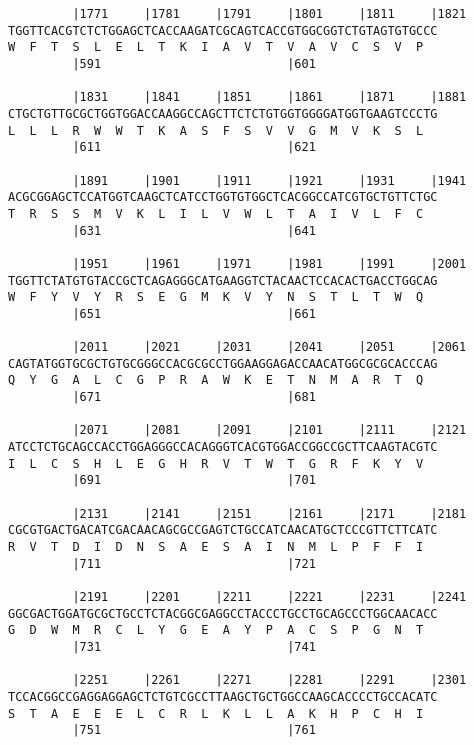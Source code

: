 \documentclass{article}
\begin{document}
\begin{Verbatim}
         |1771     |1781     |1791     |1801     |1811     |1821
TGGTTCACGTCTCTGGAGCTCACCAAGATCGCAGTCACCGTGGCGGTCTGTAGTGTGCCC
W  F  T  S  L  E  L  T  K  I  A  V  T  V  A  V  C  S  V  P  
         |591                          |601                 
  
         |1831     |1841     |1851     |1861     |1871     |1881
CTGCTGTTGCGCTGGTGGACCAAGGCCAGCTTCTCTGTGGTGGGGATGGTGAAGTCCCTG
L  L  L  R  W  W  T  K  A  S  F  S  V  V  G  M  V  K  S  L  
         |611                          |621                 
  
         |1891     |1901     |1911     |1921     |1931     |1941
ACGCGGAGCTCCATGGTCAAGCTCATCCTGGTGTGGCTCACGGCCATCGTGCTGTTCTGC
T  R  S  S  M  V  K  L  I  L  V  W  L  T  A  I  V  L  F  C  
         |631                          |641                 
  
         |1951     |1961     |1971     |1981     |1991     |2001
TGGTTCTATGTGTACCGCTCAGAGGGCATGAAGGTCTACAACTCCACACTGACCTGGCAG
W  F  Y  V  Y  R  S  E  G  M  K  V  Y  N  S  T  L  T  W  Q  
         |651                          |661                 
  
         |2011     |2021     |2031     |2041     |2051     |2061
CAGTATGGTGCGCTGTGCGGGCCACGCGCCTGGAAGGAGACCAACATGGCGCGCACCCAG
Q  Y  G  A  L  C  G  P  R  A  W  K  E  T  N  M  A  R  T  Q  
         |671                          |681                 
  
         |2071     |2081     |2091     |2101     |2111     |2121
ATCCTCTGCAGCCACCTGGAGGGCCACAGGGTCACGTGGACCGGCCGCTTCAAGTACGTC
I  L  C  S  H  L  E  G  H  R  V  T  W  T  G  R  F  K  Y  V  
         |691                          |701                 
  
         |2131     |2141     |2151     |2161     |2171     |2181
CGCGTGACTGACATCGACAACAGCGCCGAGTCTGCCATCAACATGCTCCCGTTCTTCATC
R  V  T  D  I  D  N  S  A  E  S  A  I  N  M  L  P  F  F  I  
         |711                          |721                 
  
         |2191     |2201     |2211     |2221     |2231     |2241
GGCGACTGGATGCGCTGCCTCTACGGCGAGGCCTACCCTGCCTGCAGCCCTGGCAACACC
G  D  W  M  R  C  L  Y  G  E  A  Y  P  A  C  S  P  G  N  T  
         |731                          |741                 
  
         |2251     |2261     |2271     |2281     |2291     |2301
TCCACGGCCGAGGAGGAGCTCTGTCGCCTTAAGCTGCTGGCCAAGCACCCCTGCCACATC
S  T  A  E  E  E  L  C  R  L  K  L  L  A  K  H  P  C  H  I  
         |751                          |761                 
  

\end{Verbatim}
\end{document}
